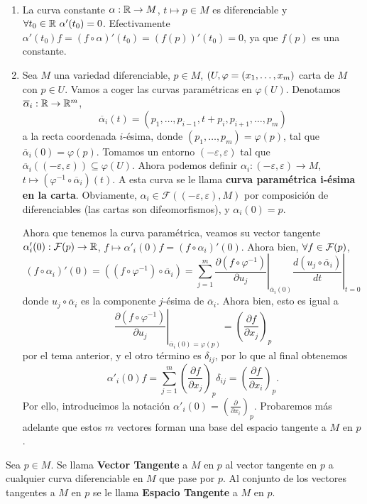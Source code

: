 \documentclass[cursovd_portada.tex]{subfiles}
\begin{document}
\begin{ejs}\
\begin{enumerate}
\item La curva constante $\alpha:\mathbb{R}\to M$, $t\mapsto p\in M$ es diferenciable y $\forall t_0\in\R\ \alpha'(t_0)=0$. Efectivamente $\alpha'(t_0)f=(f\circ\alpha)'(t_0)=(f(p))'(t_0)=0$, ya que $f(p)$ es una constante.
\item Sea $M$ una variedad diferenciable, $p\in M$, $(U,\varphi=(x_1,\dotsc,x_{m})$ carta de $M$ con $p\in U$. Vamos a coger las curvas paramétricas en $\varphi(U)$. Denotamos $\overline{\alpha}_i:\mathbb{R}\to\mathbb{R}^m$, $$\overline{\alpha}_i(t)=(p_1,\dots,p_{i-1},t+p_i,p_{i+1},\dots,p_m)$$ a la recta coordenada $i$-ésima, donde $(p_1,\dots,p_m)=\varphi(p)$, tal que $\overline{\alpha}_i(0)=\varphi(p)$. Tomamos un entorno $(-\varepsilon,\varepsilon)$ tal que $\overline{\alpha}_i((-\varepsilon,\varepsilon))\subseteq\varphi(U)$. Ahora podemos definir $\alpha_i:(-\varepsilon,\varepsilon)\to M$, $t\mapsto (\varphi^{-1}\circ\overline{\alpha}_i)(t)$. A esta curva se le llama \textbf{curva paramétrica i-ésima en la carta}. Obviamente, $\alpha_i\in\mathcal{F}((-\varepsilon,\varepsilon),M)$ por composición de diferenciables (las cartas son difeomorfismos), y $\alpha_i(0)=p$.

Ahora que tenemos la curva paramétrica, veamos su vector tangente $\alpha'_i(0):\mathcal{F}(p)\to\mathbb{R}$, $f\mapsto \alpha'_i(0)f=(f\circ\alpha_i)'(0)$. Ahora bien, $\forall f\in\mathcal{F}(p)$, 
$$(f\circ\alpha_i)'(0)=((f\circ\varphi^{-1})\circ\overline{\alpha}_i)=\sum_{j=1}^m \left.\frac{\partial (f\circ\varphi^{-1})}{\partial u_j}\right|_{\overline{\alpha}_i(0)}\left.\frac{d(u_j\circ\overline{\alpha}_i)}{dt}\right|_{t=0}$$
donde $u_j\circ\overline{\alpha}_i$ es la componente $j$-ésima de $\overline{\alpha}_i$. Ahora bien, esto es igual a
$$
\left.\frac{\partial (f\circ\varphi^{-1})}{\partial u_j}\right|_{\overline{\alpha}_i(0)=\varphi(p)}=\left(\frac{\partial f}{\partial x_j}\right)_p
$$
por el tema anterior, y el otro término es $\delta_{ij}$, por lo que al final obtenemos
$$
\alpha'_i(0)f=\sum_{j=1}^m\left(\frac{\partial f}{\partial x_j}\right)_p\delta_{ij}=\left(\frac{\partial f}{\partial x_i}\right)_p.
$$
Por ello, introducimos la notación $\alpha'_i(0)=\left(\frac{\partial}{\partial x_i}\right)_p$. Probaremos más adelante que estos $m$ vectores forman una base del espacio tangente a $M$ en $p$.
\end{enumerate}
\end{ejs}

\begin{defi}
Sea $p\in M$. Se llama {\bf Vector Tangente} a $M$ en $p$ al vector tangente en $p$ a cualquier curva
diferenciable en $M$ que pase por $p$. Al conjunto de los vectores tangentes a $M$ en $p$ se le llama {\bf Espacio
Tangente} a $M$ en $p$.
\end{defi}
\end{document}
